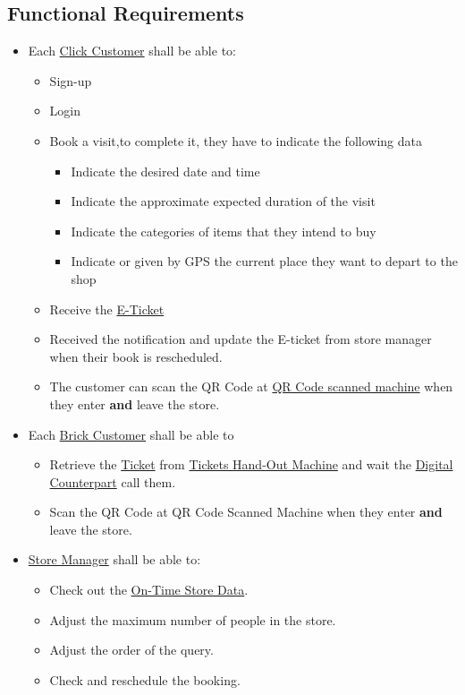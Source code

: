 \documentclass[a4paper,12pt]{book}
\begin{document}
\subsection{Functional Requirements}
\begin{itemize}
	\item Each \hyperref[Definitions]{Click Customer} shall be able to: 
	\begin{itemize}
		\item Sign-up 
		\item Login
		\item Book a visit,to complete it, they have to indicate the following data
		\begin{itemize}
			\item Indicate the desired date and time
			\item Indicate the approximate expected duration of the visit
			\item Indicate the categories of items that they intend to buy
			\item Indicate or given by GPS the current place they want to depart to the shop
		\end{itemize}
		\item Receive the \hyperref[Definitions]{E-Ticket} 
		\item Received the notification and update the E-ticket from store manager when their book is rescheduled.
		\item The customer can scan the QR Code at \hyperref[Definitions]{QR Code scanned machine} when they enter \textbf{and} leave the store.
	\end{itemize}

	\item Each \hyperref[Definitions]{Brick Customer} shall be able to
	\begin{itemize}
		\item Retrieve the \hyperref[Definitions]{Ticket} from \hyperref[Definitions]{Tickets Hand-Out Machine} and wait the \hyperref[Definitions]{Digital Counterpart} call them.
		\item Scan the QR Code at QR Code Scanned Machine when they enter \textbf{and} leave the store.
	\end{itemize}

	\item \hyperref[Definitions]{Store Manager} shall be able to: 
	\begin{itemize}
		\item Check out the \hyperref[Definitions]{On-Time Store Data}.
		\item Adjust the maximum number of people in the store.
		\item Adjust the order of the query.
		\item Check and reschedule the booking.
	\end{itemize}


\end{itemize}
\end{document}
